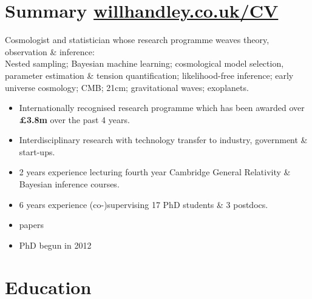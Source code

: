 \documentclass[11pt,a4paper,sans]{moderncv}
\begin{document}
\makecvtitle{}
\vspace{-10pt}
\section{Summary \hfill\href{www.willhandley.co.uk/CV}{willhandley.co.uk/CV}}
Cosmologist and statistician whose research programme weaves theory, observation \& inference:\\
Nested sampling; Bayesian machine learning; cosmological model selection, parameter estimation \& tension quantification; likelihood-free inference; early universe cosmology; CMB; 21cm; gravitational waves; exoplanets.
    \vspace{0.5ex}
\begin{itemize}
    \item Internationally recognised research programme which has been awarded over \textbf{\pounds3.8m} over the past 4 years.
    \item Interdisciplinary research with technology transfer to industry, government \& start-ups.
    \item 2 years experience lecturing fourth year Cambridge General Relativity \& Bayesian inference courses. 
    \item 6 years experience (co-)supervising 17 PhD students \& 3 postdocs.
    \item {} papers
    \item PhD begun in 2012
\end{itemize}

\section{Education}
\end{document}
